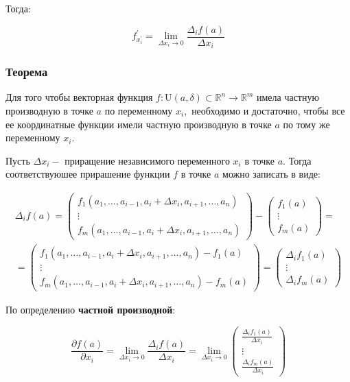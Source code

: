 Тогда:

\[ f_{x_{i}^{\prime}}^{\prime}=\lim _{\Delta x_{i} \rightarrow 0} \frac{\Delta_{i} f(a)}{\Delta x_{i}}\]

\subsubsection{Теорема}

Для того чтобы векторная функция
\(f: \mathrm{U}(a, \delta) \subset \mathbb{R}^{n} \rightarrow \mathbb{R}^{m}\)
имела частную производную в точке \(a\) по переменному \(x_{i},\)
необходимо и достаточно, чтобы все ее координатные функции имели частную
производную в точке \(a\) по тому же переменному \(x_{i}\).

Пусть \(\Delta x_{i}-\) приращение независимого переменного \(x_{i}\) в
точке \(a .\) Тогда соответствуюшее прирашение функции \(f\) в точке
\(a\) можно записать в виде:

\[\begin{array}{c}
\Delta_{i} f(a)=\left(\begin{array}{c}
f_{1}\left(a_{1}, \ldots, a_{i-1}, a_{i}+\Delta x_{i}, a_{i+1}, \ldots, a_{n}\right) \\
\vdots \\
f_{m}\left(a_{1}, \ldots, a_{i-1}, a_{i}+\Delta x_{i}, a_{i+1}, \ldots, a_{n}\right)
\end{array}\right)-\left(\begin{array}{c}
f_{1}(a) \\
\vdots \\
f_{m}(a)
\end{array}\right)= \\
=\left(\begin{array}{c}
f_{1}\left(a_{1}, \ldots, a_{i-1}, a_{i}+\Delta x_{i}, a_{i+1}, \ldots, a_{n}\right)-f_{1}(a) \\
\vdots \\
f_{m}\left(a_{1}, \ldots, a_{i-1}, a_{i}+\Delta x_{i}, a_{i+1}, \ldots, a_{n}\right)-f_{m}(a)
\end{array}\right)=\left(\begin{array}{c}
\Delta_{i} f_{1}(a) \\
\vdots \\
\Delta_{i} f_{m}(a)
\end{array}\right)
\end{array}\]

По определению \textbf{частной производной}:

\[\frac{\partial f(a)}{\partial x_{i}}=\lim _{\Delta x_{i} \rightarrow 0} \frac{\Delta_{i} f(a)}{\Delta x_{i}}=\lim _{\Delta x_{i} \rightarrow 0}\left(\begin{array}{c}
\frac{\Delta_{i} f_{1}(a)}{\Delta x_{i}} \\
\vdots \\
\frac{\Delta_{i} f_{m}(a)}{\Delta x_{i}}
\end{array}\right)\]

